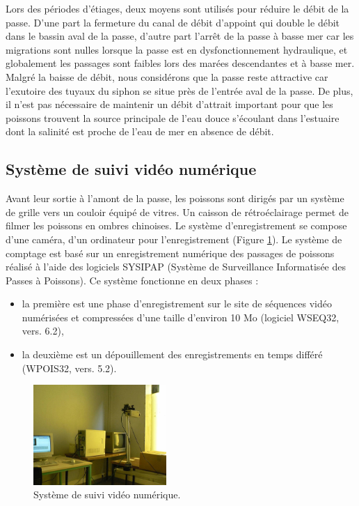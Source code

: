 \documentclass[11pt,twocolumn,titlepage,twoside]{article}\usepackage[]{graphicx}\usepackage[]{color}
\begin{document}
Lors des périodes d'étiages, deux moyens sont utilisés pour réduire le débit de
la passe. D'une part la fermeture du canal de débit d'appoint qui double
le débit dans le bassin aval de la passe, d'autre part l'arrêt de la passe
à basse mer car les migrations sont nulles lorsque la passe est en
dysfonctionnement hydraulique, et globalement les passages sont faibles
lors des marées descendantes et à basse mer. Malgré la baisse de débit, nous
considérons que la passe reste attractive car l'exutoire des tuyaux du siphon se situe près de l'entrée aval de la passe. 
De plus, il n'est pas nécessaire de maintenir un débit d'attrait important pour
que les poissons trouvent la source principale de l'eau douce s'écoulant dans l'estuaire dont la salinité
est proche de l'eau de mer en absence de débit.



\subsection{Système de suivi vidéo numérique}

Avant leur sortie à l'amont de la passe, les poissons sont dirigés par un
système de grille vers un couloir équipé de vitres. Un caisson de rétroéclairage
permet de filmer les poissons en ombres chinoises. Le système d'enregistrement
se compose d'une caméra, d'un ordinateur pour l'enregistrement (Figure
\ref{photo:suivi_numerique}). Le système de comptage est basé sur un enregistrement numérique des passages de poissons réalisé à l’aide des logiciels SYSIPAP (Système de Surveillance Informatisée 
des Passes à Poissons). Ce système fonctionne en deux phases :

\begin{itemize}
\item la première est une phase d'enregistrement sur le site de séquences vidéo
numérisées et compressées d’une taille d’environ 10 Mo (logiciel WSEQ32, vers. 6.2),
\item la deuxième est un dépouillement des enregistrements en temps différé
(WPOIS32, vers. 5.2).
\end{itemize}

\begin{figure}[htpb]
\centering
\includegraphics[width=0.45\textwidth]{suivi_numerique.jpg}
\caption{Système de suivi vidéo numérique.
}
\label{photo:suivi_numerique}
\end{figure}
\end{document}
